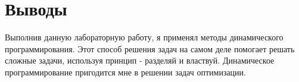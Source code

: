 \section{Выводы}

Выполнив данную лабораторную работу, я применял методы динамического программирования. Этот способ решения задач на самом деле помогает решать сложные задачи, используя принцип - разделяй и властвуй. Динамическое программирование пригодится мне в решении задач оптимизации. 

\pagebreak
